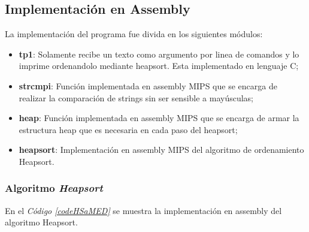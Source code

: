 \documentclass{article}
\newcommand{\refcode}[1]{\textit{Código \ref{#1}}}
\begin{document}
\lstset{ language = C } %
 
\bigskip


\lstset{ language = C } %
 
\bigskip\bigskip



\subsection{Implementación en Assembly}

	La implementación del programa fue divida en los siguientes módulos:
	\medskip

\begin{itemize}

\itemsep=2pt \topsep=0pt \partopsep=0pt \parskip=0pt \parsep=0pt
	\item \textbf{tp1}: Solamente recibe un texto como argumento por linea de comandos y lo imprime ordenandolo mediante heapsort. Esta implementado en lenguaje C;
	\item \textbf{strcmpi}: Función implementada en assembly MIPS que se encarga de realizar la comparación de strings sin ser sensible a mayúsculas;
	\item \textbf{heap}: Función implementada en assembly MIPS que se encarga de armar la estructura heap que es necesaria en cada paso del heapsort;
	\item \textbf{heapsort}: Implementación en assembly MIPS del algoritmo de ordenamiento Heapsort.

\end{itemize}	
\medskip




\subsubsection{Algoritmo \textit{Heapsort}}

	En el \refcode{codeHSaMED} se muestra la implementación en assembly del algoritmo Heapsort.

\lstset{ language = [mips]Assembler} %
 
\bigskip\bigskip\medskip
\end{document}
